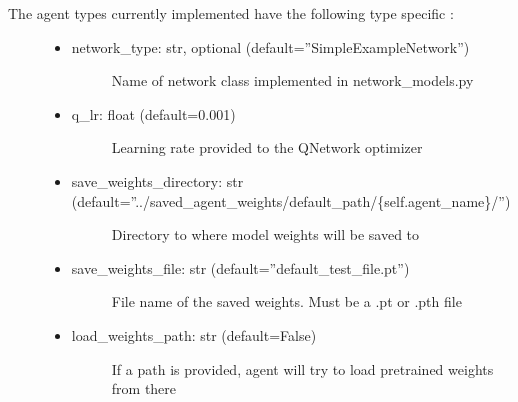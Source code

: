 \documentclass[letterpaper,10pt,english]{sphinxmanual}
\begin{document}
\sphinxAtStartPar
The agent types currently implemented have the following type specific :
\begin{description}
\item[{}] \leavevmode\begin{itemize}
\item {} \begin{description}
\item[{network\_type: str, optional (default=”SimpleExampleNetwork”)}] \leavevmode
\sphinxAtStartPar
Name of network class implemented in network\_models.py

\end{description}

\item {} \begin{description}
\item[{q\_lr: float (default=0.001)}] \leavevmode
\sphinxAtStartPar
Learning rate provided to the Q\sphinxhyphen{}Network optimizer

\end{description}

\item {} \begin{description}
\item[{save\_weights\_directory: str (default=”../saved\_agent\_weights/default\_path/\{self.agent\_name\}/”)}] \leavevmode
\sphinxAtStartPar
Directory to where model weights will be saved to

\end{description}

\item {} \begin{description}
\item[{save\_weights\_file: str (default=”default\_test\_file.pt”)}] \leavevmode
\sphinxAtStartPar
File name of the saved weights. Must be a .pt or .pth file

\end{description}

\item {} \begin{description}
\item[{load\_weights\_path: str (default=False)}] \leavevmode
\sphinxAtStartPar
If a path is provided, agent will try to load pretrained weights from there

\end{description}

\end{itemize}


\end{description}
\end{document}
